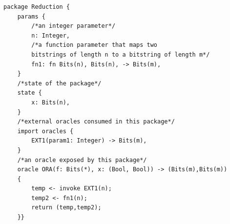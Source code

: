 \begin{longlisting}
\begin{verbatim}
package Reduction {
    params {
        /*an integer parameter*/
        n: Integer, 
        /*a function parameter that maps two 
        bitstrings of length n to a bitstring of length m*/
        fn1: fn Bits(n), Bits(n), -> Bits(m),
    }
    /*state of the package*/
    state {
        x: Bits(n),  
    }
    /*external oracles consumed in this package*/
    import oracles {
        EXT1(param1: Integer) -> Bits(m),
    }
    /*an oracle exposed by this package*/
    oracle ORA(f: Bits(*), x: (Bool, Bool)) -> (Bits(m),Bits(m)) 
    {
        temp <- invoke EXT1(n);
        temp2 <- fn1(n);
        return (temp,temp2);
    }}
\end{verbatim}
\caption{Example Domino package}
\label{lst:domino-pkg-example}
\end{longlisting}